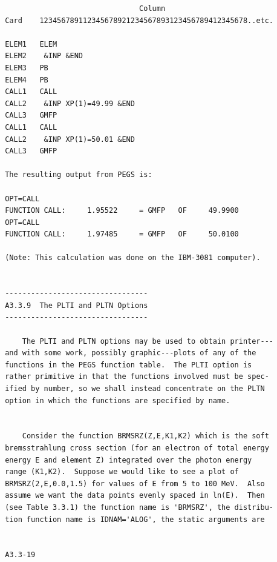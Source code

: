  \begin{verbatim}
                                Column
 Card    123456789112345678921234567893123456789412345678..etc.

 ELEM1   ELEM
 ELEM2    &INP &END
 ELEM3   PB
 ELEM4   PB
 CALL1   CALL
 CALL2    &INP XP(1)=49.99 &END
 CALL3   GMFP
 CALL1   CALL
 CALL2    &INP XP(1)=50.01 &END
 CALL3   GMFP

 The resulting output from PEGS is:

 OPT=CALL
 FUNCTION CALL:     1.95522     = GMFP   OF     49.9900
 OPT=CALL
 FUNCTION CALL:     1.97485     = GMFP   OF     50.0100

 (Note: This calculation was done on the IBM-3081 computer).


 ---------------------------------
 A3.3.9  The PLTI and PLTN Options
 ---------------------------------

     The PLTI and PLTN options may be used to obtain printer---
 and with some work, possibly graphic---plots of any of the
 functions in the PEGS function table.  The PLTI option is
 rather primitive in that the functions involved must be spec-
 ified by number, so we shall instead concentrate on the PLTN
 option in which the functions are specified by name.


     Consider the function BRMSRZ(Z,E,K1,K2) which is the soft
 bremsstrahlung cross section (for an electron of total energy
 energy E and element Z) integrated over the photon energy
 range (K1,K2).  Suppose we would like to see a plot of
 BRMSRZ(2,E,0.0,1.5) for values of E from 5 to 100 MeV.  Also
 assume we want the data points evenly spaced in ln(E).  Then
 (see Table 3.3.1) the function name is 'BRMSRZ', the distribu-
 tion function name is IDNAM='ALOG', the static arguments are


 A3.3-19
\end{verbatim}
